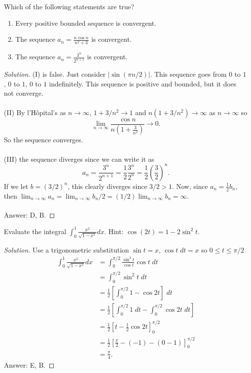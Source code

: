 \begin{problem}
Which of the following statements are true?
\begin{enumerate}[label=(\MakeUppercase{\roman*})]
\item Every positive bounded sequence is convergent.
\item The sequence $\displaystyle a_n=\frac{n\cos n}{n^2+3}$ is
  convergent.
\item The sequence $\displaystyle a_n=\frac{3^n}{2^{n+1}}$ is convergent.
\end{enumerate}
\end{problem}
\begin{proof}[Solution]
(I) is false. Just consider $|\sin(\pi n/2)|$. This sequence goes from $0$
to $1$, $0$ to $1$, $0$ to $1$ indefinitely. This sequence is positive and
bounded, but it does not converge.
\\\\
(II) By l'Hôpital's as $n\to\infty$, $1+3/n^2\to 1$ and
$n(1+3/n^2)\to\infty$ as $n\to\infty$ so
\[
\lim_{n\to\infty}\frac{\cos n}{n(1+\frac{3}{n^2})}\to 0.
\]
So the sequence converges.
\\\\
(III) the sequence diverges since we can write it as
\[
a_n=\frac{3^n}{2^{n+1}}=\frac{1}{2}\frac{3^n}{2^n}=\frac{1}{2}\left(\frac{3}{2}\right)^n.
\]
If we let $b=(3/2)^n$, this clearly diverges since $3/2>1$. Now, since
$a_n=\frac{1}{2}b_n$, then $\lim_{n\to\infty}a_n=\lim_{n\to\infty}
b_n/2=(1/2)\lim_{n\to\infty}b_n=\infty$.
\\\\
Answer: {\color{Red} D}, {\color{Green} B}.
\end{proof}

\begin{problem}
Evaluate the integral
$\displaystyle\int_0^1\frac{x^2}{\sqrt{1-x^2}}dx$. Hint:
$\cos(2t)=1-2\sin^2 t$.
\end{problem}
\begin{proof}[Solution]
Use a trigonometric substitution $\sin t=x$, $\cos t\;dt= x$ so $0\leq
t\leq\pi/2$
\begin{align*}
\int_0^1\frac{x^2}{\sqrt{1-x^2}}dx
&=\int_0^{\pi/2}\frac{\sin^2 t}{\cos t}\cos t\;dt\\
&=\int_0^{\pi/2}\sin^2 t\;dt\\
&=\frac{1}{2}\left[\int_0^{\pi/2}1-\cos 2t\right]\;dt\\
&=\frac{1}{2}\left[\int_0^{\pi/2}1\;dt-\int_0^{\pi/2}\cos 2t\;dt\right]\\
&=\frac{1}{2}\left[t-\frac{1}{2}\cos 2t\right]_0^{\pi/2}\\
&=\frac{1}{2}\left[\frac{\pi}{2}-(-1)-\left(0-1\right)\right]_0^{\pi/2}\\
&=\boxed{\frac{\pi}{4}.}
\end{align*}
Answer: {\color{Red} E}, {\color{Green} B}.
\end{proof}

